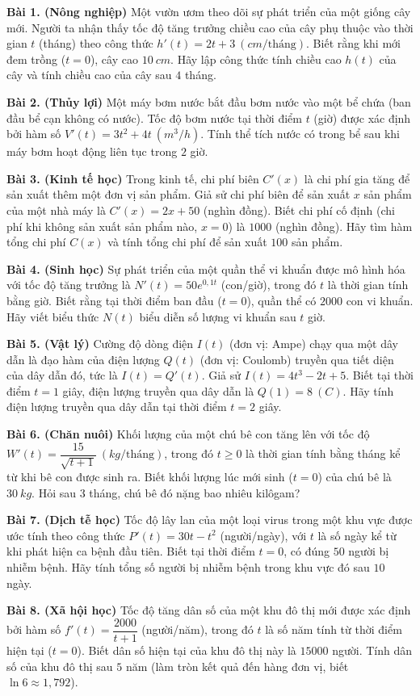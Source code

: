 \documentclass[12pt]{article}
\begin{document}
	\begin{btxanh}[]
		\textbf{Bài 1. (Nông nghiệp)} Một vườn ươm theo dõi sự phát triển của một giống cây mới. Người ta nhận thấy tốc độ tăng trưởng chiều cao của cây phụ thuộc vào thời gian $t$ (tháng) theo công thức $h'(t) = 2t + 3 \ (cm/\text{tháng})$. Biết rằng khi mới đem trồng ($t = 0$), cây cao $10 \ cm$. Hãy lập công thức tính chiều cao $h(t)$ của cây và tính chiều cao của cây sau $4$ tháng.
		
		\textbf{Bài 2. (Thủy lợi)} Một máy bơm nước bắt đầu bơm nước vào một bể chứa (ban đầu bể cạn không có nước). Tốc độ bơm nước tại thời điểm $t$ (giờ) được xác định bởi hàm số $V'(t) = 3t^2 + 4t \ (m^3/h)$. Tính thể tích nước có trong bể sau khi máy bơm hoạt động liên tục trong $2$ giờ.
		
		\textbf{Bài 3. (Kinh tế học)} Trong kinh tế, chi phí biên $C'(x)$ là chi phí gia tăng để sản xuất thêm một đơn vị sản phẩm. Giả sử chi phí biên để sản xuất $x$ sản phẩm của một nhà máy là $C'(x) = 2x + 50$ (nghìn đồng). Biết chi phí cố định (chi phí khi không sản xuất sản phẩm nào, $x = 0$) là $1000$ (nghìn đồng). Hãy tìm hàm tổng chi phí $C(x)$ và tính tổng chi phí để sản xuất $100$ sản phẩm.
		
		\textbf{Bài 4. (Sinh học)} Sự phát triển của một quần thể vi khuẩn được mô hình hóa với tốc độ tăng trưởng là $N'(t) = 50e^{0,1t}$ (con/giờ), trong đó $t$ là thời gian tính bằng giờ. Biết rằng tại thời điểm ban đầu ($t = 0$), quần thể có $2000$ con vi khuẩn. Hãy viết biểu thức $N(t)$ biểu diễn số lượng vi khuẩn sau $t$ giờ.
		
		\textbf{Bài 5. (Vật lý)} Cường độ dòng điện $I(t)$ (đơn vị: Ampe) chạy qua một dây dẫn là đạo hàm của điện lượng $Q(t)$ (đơn vị: Coulomb) truyền qua tiết diện của dây dẫn đó, tức là $I(t) = Q'(t)$. Giả sử $I(t) = 4t^3 - 2t + 5$. Biết tại thời điểm $t = 1$ giây, điện lượng truyền qua dây dẫn là $Q(1) = 8 \ (C)$. Hãy tính điện lượng truyền qua dây dẫn tại thời điểm $t = 2$ giây.
		
		\textbf{Bài 6. (Chăn nuôi)} Khối lượng của một chú bê con tăng lên với tốc độ $W'(t) = \dfrac{15}{\sqrt{t+1}} \ (kg/\text{tháng})$, trong đó $t \ge 0$ là thời gian tính bằng tháng kể từ khi bê con được sinh ra. Biết khối lượng lúc mới sinh ($t = 0$) của chú bê là $30 \ kg$. Hỏi sau $3$ tháng, chú bê đó nặng bao nhiêu kilôgam?
		
		\textbf{Bài 7. (Dịch tễ học)} Tốc độ lây lan của một loại virus trong một khu vực được ước tính theo công thức $P'(t) = 30t - t^2$ (người/ngày), với $t$ là số ngày kể từ khi phát hiện ca bệnh đầu tiên. Biết tại thời điểm $t = 0$, có đúng $50$ người bị nhiễm bệnh. Hãy tính tổng số người bị nhiễm bệnh trong khu vực đó sau $10$ ngày.
		
		\textbf{Bài 8. (Xã hội học)} Tốc độ tăng dân số của một khu đô thị mới được xác định bởi hàm số $f'(t) = \dfrac{2000}{t+1}$ (người/năm), trong đó $t$ là số năm tính từ thời điểm hiện tại ($t = 0$). Biết dân số hiện tại của khu đô thị này là $15000$ người. Tính dân số của khu đô thị sau $5$ năm (làm tròn kết quả đến hàng đơn vị, biết $\ln 6 \approx 1,792$).
	\end{btxanh}
	
\end{document}
